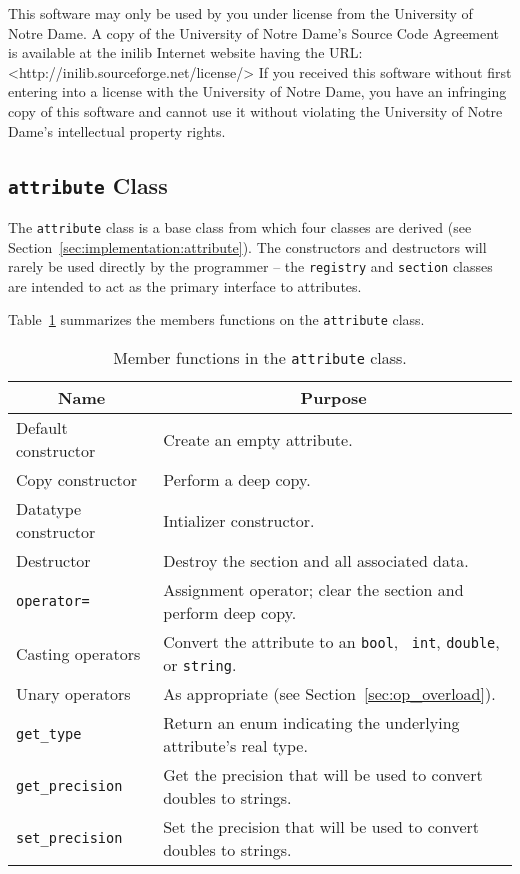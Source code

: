 %
This software may only be used by you under license from the
University of Notre Dame.  A copy of the University of Notre Dame's
Source Code Agreement is available at the inilib Internet website
having the URL: <http://inilib.sourceforge.net/license/> If you
received this software without first entering into a license with the
University of Notre Dame, you have an infringing copy of this software
and cannot use it without violating the University of Notre Dame's
intellectual property rights.
% 
%

\subsection[attribute]{{\tt attribute} Class}
\label{sec:attribute}

The {\tt attribute} class is a base class from which four classes are
derived (see Section~\ref{sec:implementation:attribute}).  The
constructors and destructors will rarely be used directly by the
programmer -- the {\tt registry} and {\tt section} classes are
intended to act as the primary interface to attributes.

Table~\ref{tbl:attribute-members} summarizes the members functions on
the {\tt attribute} class.

\begin{table}[htbp]
  \begin{center}
    \leavevmode
    \begin{tabular}{|l|p{3in}|}
      \hline
      \multicolumn{1}{|c|}{Name} & \multicolumn{1}{c|}{Purpose} \\
      \hline
      Default constructor & Create an empty attribute. \\
      Copy constructor & Perform a deep copy. \\
      {\sc Datatype} constructor & Intializer constructor. \\
      Destructor & Destroy the section and all associated data. \\
      \hline
      {\tt operator=} & Assignment operator; clear the section and
      perform deep copy.\\
      Casting operators & Convert the attribute to an {\tt bool}, {\tt
        int}, {\tt double}, or {\tt string}. \\
      Unary operators & As appropriate (see
      Section~\ref{sec:op_overload}). \\
      {\tt get\_type} & Return an enum indicating the underlying
      attribute's real type. \\
      {\tt get\_precision} & Get the precision that will be used to
      convert doubles to strings. \\
      {\tt set\_precision} & Set the precision that will be used to
      convert doubles to strings. \\
      \hline
    \end{tabular}
    \caption{Member functions in the {\tt attribute} class.}
    \label{tbl:attribute-members}
  \end{center}
\end{table}


